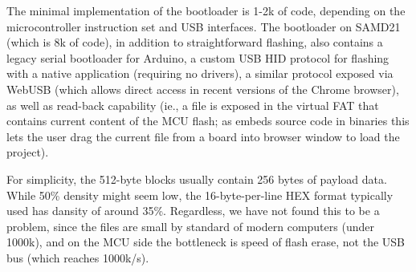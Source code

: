 The minimal implementation of the \UF bootloader is 1-2k of code, depending
on the microcontroller instruction set and USB interfaces.
The \UF bootloader on SAMD21 (which is 8k of code), in addition to straightforward \UF flashing,
also contains a legacy serial bootloader for Arduino, 
a custom USB HID protocol for flashing with a native application (requiring no drivers),
a similar protocol exposed via WebUSB (which allows direct access in recent versions of the Chrome browser),
as well as \UF read-back capability (ie.,
a \UF file is exposed in the virtual FAT that contains current content of the 
MCU flash; as \MC embeds source code in binaries this lets the user drag the current \UF file from
a board into \MC browser window to load the project).

For simplicity, the 512-byte \UF blocks usually contain 256 bytes of payload data.
While 50\% density might seem low, the 16-byte-per-line HEX format typically used has dansity of around 35\%.
Regardless, we have not found this to be a problem, since the files are small by standard of modern computers (under 1000k),
and on the MCU side the bottleneck is speed of flash erase, not the USB bus (which reaches 1000k/s).

